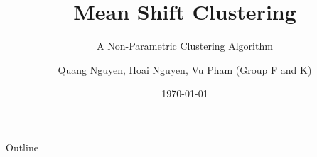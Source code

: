 \documentclass[aspectratio=169]{beamer}
\title[Mean Shift]{Mean Shift Clustering}  %
\subtitle{A Non-Parametric Clustering Algorithm}
\author[Q. Nguyen, H. Nguyen, V. Pham]{Quang Nguyen, Hoai Nguyen, Vu Pham (Group F and K)}  %
\institute{Computational Statistics Lab}
\date[\the\year]{\today}  %
\begin{document}
\begin{frame}
    \titlepage
\end{frame}

\begin{frame}{Outline}
    \tableofcontents
\end{frame}




% 


% 
\end{document}

